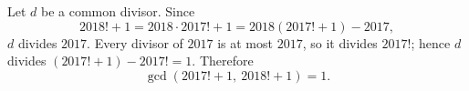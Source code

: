 Let $d$ be a common divisor. Since
\[2018!+1=2018\cdot2017!+1=2018\left(2017!+1\right)-2017,\]
$d$ divides $2017$. Every divisor of $2017$ is at most $2017$, so it divides $2017!$; hence $d$ divides $\left(2017!+1\right)-2017!=1$. Therefore
\[\gcd\left(2017!+1,\ 2018!+1\right)=\boxed{1}.\]
